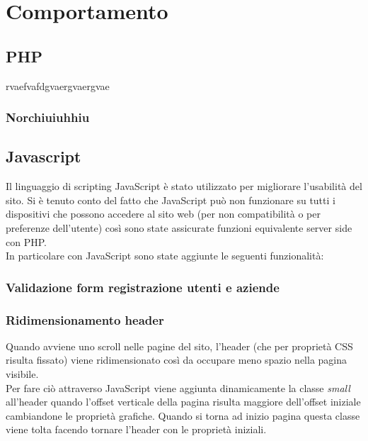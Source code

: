 \section{Comportamento}
	\subsection{PHP}
	rvaefvafdgvaergvaergvae
	 \subsubsection{Norchiuiuhhiu}
	\subsection{Javascript}
	 Il linguaggio di scripting JavaScript è stato utilizzato per migliorare l'usabilità del sito. Si è tenuto conto del fatto che JavaScript può non funzionare su tutti i dispositivi che possono accedere al sito web (per non compatibilità o per preferenze dell'utente) così sono state assicurate funzioni equivalente server side con PHP.\\
	 In particolare con JavaScript sono state aggiunte le seguenti funzionalità:
		\subsubsection{Validazione form registrazione utenti e aziende}
		
		\subsubsection{Ridimensionamento header}
		Quando avviene uno scroll nelle pagine del sito, l'header (che per proprietà CSS risulta fissato) viene ridimensionato così da occupare meno spazio nella pagina visibile. \\
		Per fare ciò attraverso JavaScript viene aggiunta dinamicamente la classe \emph{small} all'header quando l'offset verticale della pagina risulta maggiore dell'offset iniziale cambiandone le proprietà grafiche.
		Quando si torna ad inizio pagina questa classe viene tolta facendo tornare l'header con le proprietà iniziali.
		
